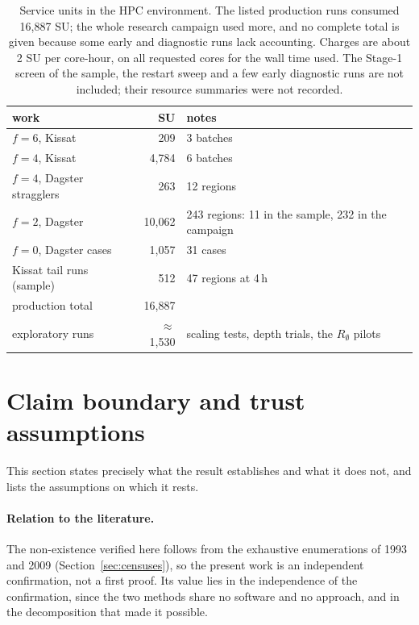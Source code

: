 \documentclass[11pt,a4paper]{article}
\theoremstyle{definition}
\begin{document}
\begin{table}[H]
\centering
\begin{tabular}{@{}lrl@{}}
\toprule
work & SU & notes \\
\midrule
$f=6$, Kissat & 209 & 3 batches \\
$f=4$, Kissat & 4{,}784 & 6 batches \\
$f=4$, Dagster stragglers & 263 & 12 regions \\
$f=2$, Dagster & 10{,}062 & 243 regions: 11 in the sample, 232 in the campaign \\
$f=0$, Dagster cases & 1{,}057 & 31 cases \\
Kissat tail runs (sample) & 512 & 47 regions at 4\,h \\
\midrule
production total & 16{,}887 & \\
\midrule
exploratory runs & $\approx$1{,}530 & scaling tests, depth trials, the $R_\emptyset$ pilots \\
\bottomrule
\end{tabular}
\caption{Service units in the HPC environment. The listed production runs consumed
16{,}887 SU; the whole research campaign used more, and no complete total is given because
some early and diagnostic runs lack accounting. Charges are about 2 SU per core-hour, on all requested cores for the wall time used. The Stage-1 screen of the sample, the restart sweep and a few early
diagnostic runs are not included; their resource summaries were not recorded.}
\label{tab:costs}
\end{table}

\section{Claim boundary and trust assumptions}\label{sec:claim}
This section states precisely what the result establishes and what it does not, and lists the assumptions on which it rests.


\paragraph{Relation to the literature.} The non-existence verified here follows from the
exhaustive enumerations of 1993 and 2009 (Section~\ref{sec:censuses}), so
the present work is an independent confirmation, not a first proof. Its value lies in the
independence of the confirmation, since the two methods share no software and no approach, and
in the decomposition that made it possible.
\end{document}
